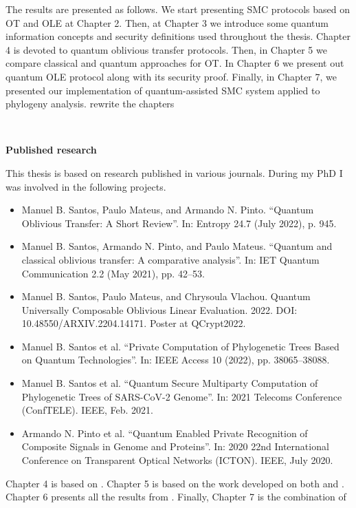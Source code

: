 The results are presented as follows. We start presenting SMC protocols based on OT and OLE at Chapter 2. Then, at Chapter 3 we introduce some quantum information concepts and security definitions used throughout the thesis. Chapter 4 is devoted to quantum oblivious transfer protocols. Then, in Chapter 5 we compare classical and quantum approaches for OT. In Chapter 6 we present out quantum OLE protocol along with its security proof. Finally, in Chapter 7, we presented our implementation of quantum-assisted SMC system applied to phylogeny analysis. {\cv rewrite the chapters}


\

\noindent\textbf{Published research}

This thesis is based on research published in various journals. During my PhD I was involved in the following projects.

\begin{itemize}
	\item\cite{SMP22} Manuel B. Santos, Paulo Mateus, and Armando N. Pinto. “Quantum Oblivious Transfer:
A Short Review”. In: Entropy 24.7 (July 2022), p. 945.

	\item\cite{SPM21} Manuel B. Santos, Armando N. Pinto, and Paulo Mateus. “Quantum and classical
oblivious transfer: A comparative analysis”. In: IET Quantum Communication 2.2 (May 2021), pp. 42–53.

	\item\cite{SMV22} Manuel B. Santos, Paulo Mateus, and Chrysoula Vlachou. Quantum Universally
Composable Oblivious Linear Evaluation. 2022. DOI: 10.48550/ARXIV.2204.14171. Poster at QCrypt2022.

	\item\cite{SGPM22} Manuel B. Santos et al. “Private Computation of Phylogenetic Trees Based on Quantum
Technologies”. In: IEEE Access 10 (2022), pp. 38065–38088.

	\item\cite{SGPM21} Manuel B. Santos et al. “Quantum Secure Multiparty Computation of Phylogenetic Trees of SARS-CoV-2 Genome”. In: 2021 Telecoms Conference (ConfTELE). IEEE, Feb. 2021.

\item\cite{POS+20} Armando N. Pinto et al. “Quantum Enabled Private Recognition of Composite Signals
in Genome and Proteins”. In: 2020 22nd International Conference on Transparent Optical
Networks (ICTON). IEEE, July 2020. 
\end{itemize}


Chapter 4 is based on \cite{SMP22}. Chapter 5 is based on the work developed on both \cite{SPM21} and \cite{SGPM22}. Chapter 6 presents all the results from \cite{SMV22}. Finally, Chapter 7 is the combination of \cite{SGPM22, SGPM21, POS+20}

%
%
%
